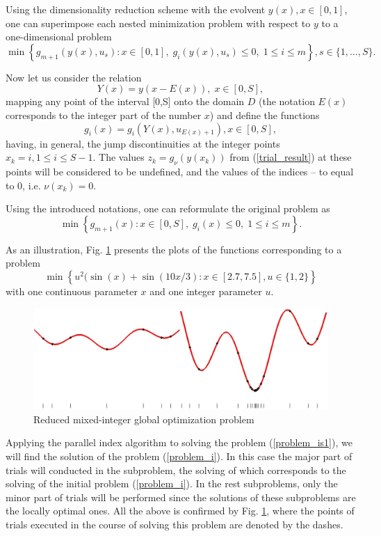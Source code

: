 \documentclass[runningheads]{llncs}
\begin{document}
Using the dimensionality reduction scheme with the evolvent $y(x), x\in [0,1]$, one can
superimpose each nested minimization problem with respect to $y$ to a one-dimensional
problem
\[
 \min{\left\{ g_{m+1}(y(x),u_s):x \in [0,1], \; g_i(y(x),u_s)\leq 0, \; 1 \leq i \leq m\right\}},
s\in\{1,...,S\}.
\]

Now let us consider the relation
\[
Y(x)=y(x-E(x)), \; x\in[0,S],
\]
mapping any point of the interval [0,S] onto the domain $D$ (the notation $E(x)$ corresponds
to the integer part of the number $x$) and define the functions
\[
g_i(x) = g_i(Y(x),u_{E(x)+1}), x\in[0,S],
\]
having, in general, the jump discontinuities at the integer points $x_k = i, 1\leq i \leq
S-1$.
The values $z_k = g_\nu(y(x_k))$ from (\ref{trial_result}) at these points will be considered to
be undefined, and the values of the indices -- to equal to 0, i.e. $\nu(x_k) = 0$.

Using the introduced notations, one can reformulate the original problem as
\begin{equation}\label{problem_is1}
\min \left\{g_{m+1}(x): x \in [0,S], \; g_i(x) \leq 0, \; 1 \leq i \leq m\right\}.
\end{equation}

As an illustration, Fig. \ref{fig:1} presents the plots of the functions corresponding to a
problem
\[
\min{\left\{ u^2 (\sin(x) +\sin(10x/3) : x\in [2.7, 7.5], u \in \{1,2\} \right\}}
\]
with one continuous parameter $x$ and one integer parameter $u$.

\begin{figure}[ht]
    \centering
    \includegraphics[width=1.0\textwidth] {fig1.jpg}
    \caption{Reduced mixed-integer global optimization problem}
    \label{fig:1}
\end{figure}

Applying the parallel index algorithm to solving the problem (\ref{problem_is1}), we will find
the solution of the problem (\ref{problem_i}). In this case the major part of trials will conducted
in
the subproblem, the solving of which corresponds to the solving of the initial
problem (\ref{problem_i}). In the rest subproblems, only the minor part of trials will be
performed
since the solutions of these subproblems are the locally optimal ones.
All the above is confirmed by Fig. \ref{fig:1}, where the
points of trials executed in the course of solving this problem are denoted by the dashes.
\end{document}
